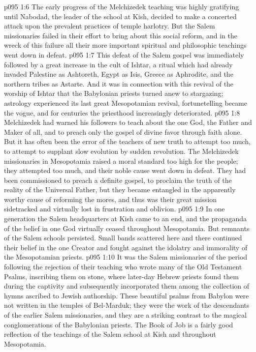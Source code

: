 \pc \vs p095 1:6 The early progress of the Melchizedek teaching was highly gratifying until Nabodad, the leader of the school at Kish, decided to make a concerted attack upon the prevalent practices of temple harlotry. But the Salem missionaries failed in their effort to bring about this social reform, and in the wreck of this failure all their more important spiritual and philosophic teachings went down in defeat.
\vs p095 1:7 This defeat of the Salem gospel was immediately followed by a great increase in the cult of Ishtar, a ritual which had already invaded Palestine as Ashtoreth, Egypt as Isis, Greece as Aphrodite, and the northern tribes as Astarte. And it was in connection with this revival of the worship of Ishtar that the Babylonian priests turned anew to stargazing; astrology experienced its last great Mesopotamian revival, fortunetelling became the vogue, and for centuries the priesthood increasingly deteriorated.
\vs p095 1:8 Melchizedek had warned his followers to teach about the one God, the Father and Maker of all, and to preach only the gospel of divine favor through faith alone. But it has often been the error of the teachers of new truth to attempt too much, to attempt to supplant slow evolution by sudden revolution. The Melchizedek missionaries in Mesopotamia raised a moral standard too high for the people; they attempted too much, and their noble cause went down in defeat. They had been commissioned to preach a definite gospel, to proclaim the truth of the reality of the Universal Father, but they became entangled in the apparently worthy cause of reforming the mores, and thus was their great mission sidetracked and virtually lost in frustration and oblivion.
\vs p095 1:9 In one generation the Salem headquarters at Kish came to an end, and the propaganda of the belief in one God virtually ceased throughout Mesopotamia. But remnants of the Salem schools persisted. Small bands scattered here and there continued their belief in the one Creator and fought against the idolatry and immorality of the Mesopotamian priests.
\pc \vs p095 1:10 It was the Salem missionaries of the period following the rejection of their teaching who wrote many of the Old Testament Psalms, inscribing them on stone, where later\hyp{}day Hebrew priests found them during the captivity and subsequently incorporated them among the collection of hymns ascribed to Jewish authorship. These beautiful psalms from Babylon were not written in the temples of Bel\hyp{}Marduk; they were the work of the descendants of the earlier Salem missionaries, and they are a striking contrast to the magical conglomerations of the Babylonian priests. The Book of Job is a fairly good reflection of the teachings of the Salem school at Kish and throughout Mesopotamia.
